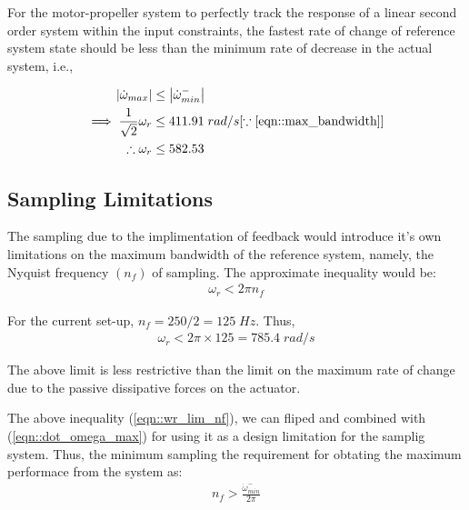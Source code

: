 
For the motor-propeller system to perfectly track the response of a linear
second order system within the input constraints, the fastest rate of change of
reference system state should be less than the minimum rate of decrease in the
actual system, i.e.,

\begin{align}
    \left\lvert \dot \omega_{max} \right\rvert &\leq \left\lvert \dot \omega^{-}_{min} \right\rvert \label{eqn::dot_omega_max}\\
    \implies \frac{1}{\sqrt{2}} \omega_r &\leq 411.91 \; rad/s
    [\because \ref{eqn::max_bandwidth}]\\
    \therefore \omega_r &\leq 582.53
    \label{eqn::omega_r_lim}
\end{align}


\subsection{Sampling Limitations}
The sampling due to the implimentation of feedback would introduce it's own
limitations on the maximum bandwidth of the reference system, namely, the
Nyquist frequency $(n_f)$ of sampling. The approximate inequality would be:
\begin{align}
    \omega_r < 2 \pi n_f
    \label{eqn::wr_lim_nf}
\end{align}

For the current set-up, $n_f = 250/2 = 125 \; Hz$. Thus,
\begin{align}
    \omega_r < 2\pi \times 125 = 785.4 \; rad/s
\end{align}

The above limit is less restrictive than the limit on the maximum rate of change
due to the passive dissipative forces on the actuator.


\bigskip {} The above inequality (\ref{eqn::wr_lim_nf}), we can fliped and
combined with (\ref{eqn::dot_omega_max}) for using it as a design limitation
for the samplig system. Thus, the minimum sampling the requirement for obtating
the maximum performace from the system as:
\begin{align}
    n_f > \frac{\dot \omega^{-}_{min}}{2 \pi}
\end{align}


